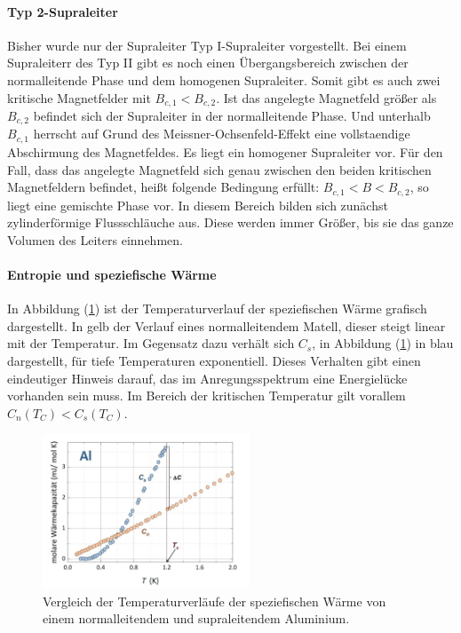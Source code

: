 \paragraph{Typ 2-Supraleiter}
\label{para:typ2}
Bisher wurde nur der Supraleiter Typ I-Supraleiter vorgestellt.
Bei einem Supraleiterr des Typ II gibt es noch einen \"{U}bergangsbereich zwischen der normalleitende Phase und dem homogenen Supraleiter.
Somit gibt es auch zwei kritische Magnetfelder mit $B_{c,1} < B_{c,2}$.
Ist das angelegte Magnetfeld gr\"{o}{\ss}er als $B_{c,2}$ befindet sich der Supraleiter in der normalleitende Phase.
Und unterhalb $B_{c,1}$ herrscht auf Grund des Meissner-Ochsenfeld-Effekt eine vollstaendige Abschirmung des Magnetfeldes.
Es liegt ein homogener Supraleiter vor.
F\"{u}r den Fall, dass das angelegte Magnetfeld sich genau zwischen den beiden kritischen Magnetfeldern befindet, hei{\ss}t folgende Bedingung erf\"{u}llt: $B_{c,1} < B < B_{c,2}$, so liegt eine gemischte Phase vor.
In diesem Bereich bilden sich zun\"{a}chst zylinderf\"{o}rmige Flussschl\"{a}uche aus.
Diese werden immer Gr\"{o}{\ss}er, bis sie das ganze Volumen des Leiters einnehmen.

\paragraph{Entropie und speziefische W\"{a}rme}
In Abbildung (\ref{abb:spezWaerme}) ist der Temperaturverlauf der speziefischen W\"{a}rme grafisch dargestellt.
In gelb der Verlauf eines normalleitendem Matell, dieser steigt linear mit der Temperatur.
Im Gegensatz dazu verh\"{a}lt sich $C_s$, in Abbildung (\ref{abb:spezWaerme}) in blau dargestellt, f\"ur tiefe Temperaturen exponentiell.
Dieses Verhalten gibt einen eindeutiger Hinweis darauf, das im Anregungsspektrum eine Energiel\"ucke vorhanden sein muss.
Im Bereich der kritischen Temperatur gilt vorallem $C_n(T_C) < C_s(T_C)$.
\begin{figure}[hbtp]
	\centering
	\includegraphics[width=0.55\textwidth]{Plots/spezWaerme.png}
	\caption{Vergleich der Temperaturverl\"{a}ufe der speziefischen W\"{a}rme von einem normalleitendem und supraleitendem Aluminium. \cite{einleitung}}
	\label{abb:spezWaerme}
\end{figure}


